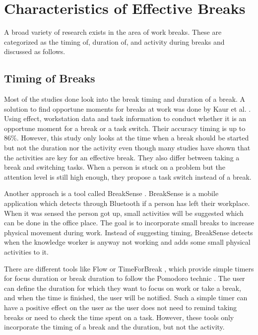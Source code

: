 \documentclass{hasel_thesis}
\begin{document}
\section{Characteristics of Effective Breaks}
A broad variety of research exists in the area of work breaks. These are categorized as the timing of, duration of, and activity during breaks and discussed as follows.


\subsection{Timing of Breaks}
Most of the studies done look into the break timing and duration of a break. A solution to find opportune moments for breaks at work was done by Kaur et al. \cite{Kaur.2020}. Using effect, workstation data and task information to conduct whether it is an opportune moment for a break or a task switch. Their accuracy timing is up to 86\%. However, this study only looks at the time when a break should be started but not the duration nor the activity even though many studies have shown that the activities are key for an effective break. They also differ between taking a break and switching tasks. When a person is stuck on a problem but the attention level is still high enough, they propose a task switch instead of a break.

Another approach is a tool called BreakSense \cite{Cambo.2017}. BreakSense is a mobile application which detects through Bluetooth if a person has left their workplace. When it was sensed the person got up, small activities will be suggested which can be done in the office place. The goal is to incorporate small breaks to increase physical movement during work. Instead of suggesting timing, BreakSense detects when the knowledge worker is anyway not working and adds some small physical activities to it.

There are different tools like Flow \cite{flow} or TimeForBreak \cite{luo.2018}, which provide simple timers for focus duration or break duration to follow the Pomodoro technic \cite{Cirillo.2006}. The user can define the duration for which they want to focus on work or take a break, and when the time is finished, the user will be notified. Such a simple timer can have a positive effect on the user as the user does not need to remind taking breaks or need to check the time spent on a task. However, these tools only incorporate the timing of a break and the duration, but not the activity.
\end{document}

